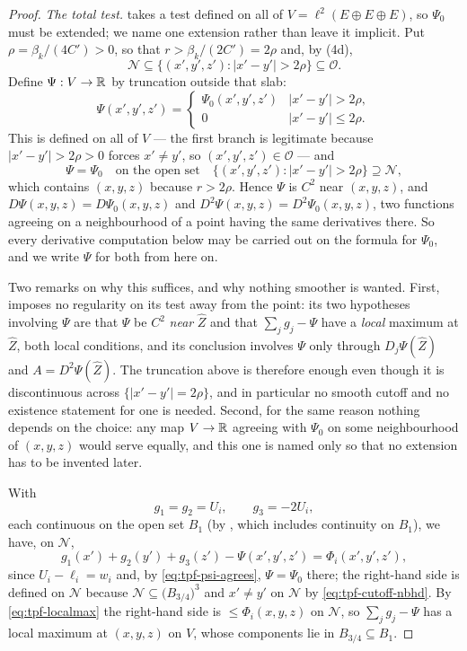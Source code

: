 \begin{proof}
\emph{The total test.}  takes a test defined on all of
$V=\ell^2(E\oplus E\oplus E)$, so $\Psi_0$ must be extended; we name one
extension rather than leave it implicit. Put $\rho=\beta_k/(4C')>0$, so that
$r>\beta_k/(2C')=2\rho$ and, by (4d),
\begin{equation}\label{eq:tpf-cutoff-nbhd}
  \mathcal N\subseteq\bigl\{(x',y',z'):|x'-y'|>2\rho\bigr\}\subseteq\mathcal O .
\end{equation}
Define $\Psi:V\to\mathbb{R}$ by truncation outside that slab:
\[
  \Psi(x',y',z')=\begin{cases}
    \Psi_0(x',y',z')&|x'-y'|>2\rho,\\
    0&|x'-y'|\le2\rho .
  \end{cases}
\]
This is defined on all of $V$ --- the first branch is legitimate because
$|x'-y'|>2\rho>0$ forces $x'\ne y'$, so $(x',y',z')\in\mathcal O$ --- and
\begin{equation}\label{eq:tpf-psi-agrees}
  \Psi=\Psi_0\quad\text{on the open set}\quad
  \bigl\{(x',y',z'):|x'-y'|>2\rho\bigr\}\supseteq\mathcal N ,
\end{equation}
which contains $(x,y,z)$ because $r>2\rho$. Hence $\Psi$ is $C^2$ near
$(x,y,z)$, and $D\Psi(x,y,z)=D\Psi_0(x,y,z)$ and
$D^2\Psi(x,y,z)=D^2\Psi_0(x,y,z)$, two functions agreeing on a neighbourhood of
a point having the same derivatives there. So every derivative computation below
may be carried out on the formula for $\Psi_0$, and we write $\Psi$ for both
from here on.

Two remarks on why this suffices, and why nothing smoother is wanted. First,
 imposes no regularity on its test away from the point: its
two hypotheses involving $\Psi$ are that $\Psi$ be $C^2$ \emph{near}
$\widehat Z$ and that $\sum_jg_j-\Psi$ have a \emph{local} maximum at
$\widehat Z$, both local conditions, and its conclusion involves $\Psi$ only
through $D_j\Psi(\widehat Z)$ and $A=D^2\Psi(\widehat Z)$. The truncation above
is therefore enough even though it is discontinuous across
$\{|x'-y'|=2\rho\}$, and in particular no smooth cutoff and no existence
statement for one is needed. Second, for the same reason nothing depends on the
choice: any map $V\to\mathbb{R}$ agreeing with $\Psi_0$ on some neighbourhood of
$(x,y,z)$ would serve equally, and this one is named only so that no extension
has to be invented later.

With
\[
  g_1=g_2=U_i,\qquad g_3=-2U_i,
\]
each continuous on the open set $B_1$ (by , which
includes continuity on $B_1$), we have, on $\mathcal N$,
\[
  g_1(x')+g_2(y')+g_3(z')-\Psi(x',y',z')=\Phi_i(x',y',z'),
\]
since $U_i-\ell_i=w_i$ and, by \eqref{eq:tpf-psi-agrees}, $\Psi=\Psi_0$ there;
the right-hand side is defined on $\mathcal N$ because
$\mathcal N\subseteq\bigl(B_{3/4}\bigr)^3$ and $x'\ne y'$ on $\mathcal N$ by
\eqref{eq:tpf-cutoff-nbhd}. By \eqref{eq:tpf-localmax} the right-hand side is
$\le\Phi_i(x,y,z)$ on $\mathcal N$, so $\sum_jg_j-\Psi$ has a local maximum at
$(x,y,z)$ on $V$, whose components lie in $B_{3/4}\subseteq B_1$.


\end{proof}
